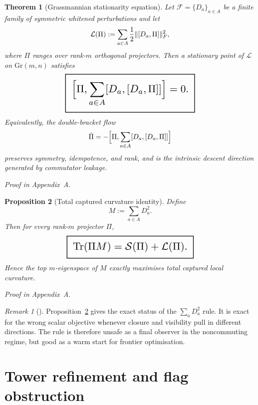 \documentclass[11pt,a4paper]{article}
\numberwithin{equation}{section}
\DeclareMathOperator{\Tr}{Tr}
\DeclarePairedDelimiter{\norm}{\lVert}{\rVert}
\newcommand{\Gr}{\mathrm{Gr}}
\newcommand{\geomboxed}[1]{%
  \setlength{\fboxsep}{8pt}%
  \setlength{\fboxrule}{0.9pt}%
  \fbox{\scalebox{1.5}{$\displaystyle #1$}}%
}
\theoremstyle{thmcompact}
\newtheorem{theorem}{Theorem}[section]
\newtheorem{proposition}[theorem]{Proposition}
\theoremstyle{remark}
\newtheorem*{remarkplain}{Remark}
\newenvironment{remark}[1][]%
{\begin{remarkbox}\begin{remarkplain}[#1]\normalfont}
{\end{remarkplain}\end{remarkbox}}
\newcommand{\proofappendix}{\par{\hfill\scriptsize\emph{Proof in Appendix~A.}}\par}
\begin{document}
\begin{theorem}[Grassmannian stationarity equation]
\label{thm:stationarity}
Let $\mathcal F=\{D_a\}_{a\in A}$ be a finite family of symmetric whitened perturbations and let
\begin{equation}
\mathcal L(\Pi):=\sum_{a\in A}\frac12\norm{[D_a,\Pi]}_F^2,
\label{eq:L-pi-def}
\end{equation}
where $\Pi$ ranges over rank-$m$ orthogonal projectors. Then a stationary point of $\mathcal L$ on $\Gr(m,n)$ satisfies
\begin{equation}
\geomboxed{\Bigl[\Pi,\sum_{a\in A}[D_a,[D_a,\Pi]]\Bigr]=0.}
\label{eq:stationarity-equation}
\end{equation}
Equivalently, the double-bracket flow
\begin{equation}
\dot \Pi=-\Bigl[\Pi,\sum_{a\in A}[D_a,[D_a,\Pi]]\Bigr]
\label{eq:double-bracket-flow}
\end{equation}
preserves symmetry, idempotence, and rank, and is the intrinsic descent direction generated by commutator leakage.
\end{theorem}

\proofappendix

\begin{proposition}[Total captured curvature identity]
\label{prop:total-captured-curvature}
Define
\begin{equation}
M:=\sum_{a\in A}D_a^2.
\label{eq:M-def}
\end{equation}
Then for every rank-$m$ projector $\Pi$,
\begin{equation}
\geomboxed{\Tr(\Pi M)=\mathcal S(\Pi)+\mathcal L(\Pi).}
\label{eq:energy-split}
\end{equation}
Hence the top $m$-eigenspace of $M$ exactly maximises total captured local curvature.
\end{proposition}

\proofappendix

\begin{remark}
Proposition~\ref{prop:total-captured-curvature} gives the exact status of the $\sum_a D_a^2$ rule. It is exact for the wrong scalar objective whenever closure and visibility pull in different directions. The rule is therefore unsafe as a final observer in the noncommuting regime, but good as a warm start for frontier optimisation.
\end{remark}

\section{Tower refinement and flag obstruction}
\end{document}
